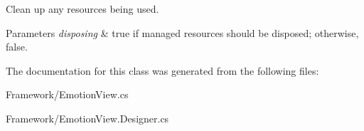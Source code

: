 Clean up any resources being used. 


\begin{DoxyParams}{Parameters}
{\em disposing} & true if managed resources should be disposed; otherwise, false.\\
\hline
\end{DoxyParams}


The documentation for this class was generated from the following files\+:\begin{DoxyCompactItemize}
\item 
Framework/Emotion\+View.\+cs\item 
Framework/Emotion\+View.\+Designer.\+cs\end{DoxyCompactItemize}
